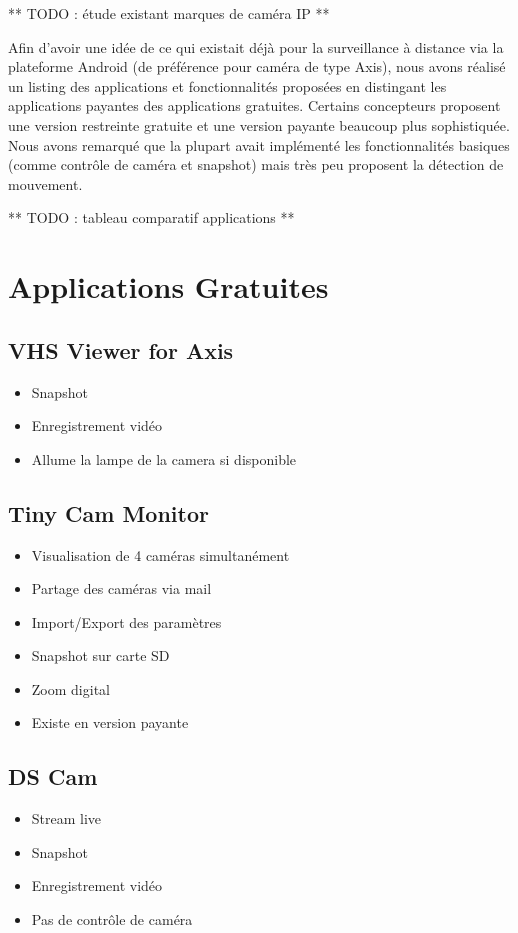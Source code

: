 ** TODO : étude existant marques de caméra IP **

Afin d'avoir une idée de ce qui existait déjà pour la surveillance à distance via la plateforme Android (de préférence pour caméra de type Axis), nous avons réalisé un listing des applications
et fonctionnalités proposées en distingant les applications payantes des applications gratuites. Certains concepteurs proposent une version restreinte gratuite et une version payante beaucoup
plus sophistiquée. Nous avons remarqué que la plupart avait implémenté les fonctionnalités basiques (comme contrôle de caméra et snapshot) mais très peu proposent la détection de mouvement.

** TODO : tableau comparatif applications **
\section{Applications Gratuites}
\subsection{VHS Viewer for Axis}
\begin{itemize}
  \item Snapshot
  \item Enregistrement vidéo
  \item Allume la lampe de la camera si disponible
\end{itemize}

\subsection{Tiny Cam Monitor}
\begin{itemize}
  \item Visualisation de 4 caméras simultanément
  \item Partage des caméras via mail
  \item Import/Export des paramètres
  \item Snapshot sur carte SD
  \item Zoom digital
  \item Existe en version payante
\end{itemize}

\subsection{DS Cam}
\begin{itemize}
  \item Stream live
  \item Snapshot
  \item Enregistrement vidéo
  \item Pas de contrôle de caméra
\end{itemize}

